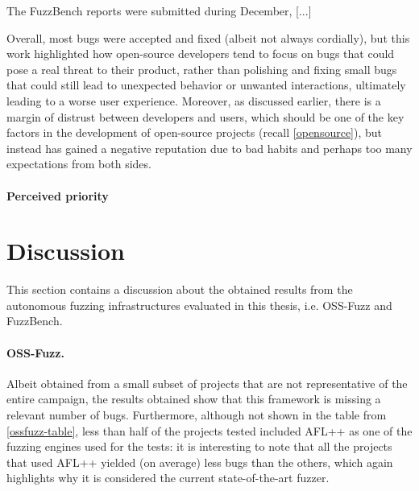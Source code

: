 The FuzzBench reports were submitted during December, [...] 

Overall, most bugs were accepted and fixed (albeit not always cordially), but this work highlighted how open-source developers tend to focus on bugs that could pose a real threat to their product, rather than polishing and fixing small bugs that could still lead to unexpected behavior or unwanted interactions, ultimately leading to a worse user experience. Moreover, as discussed earlier, there is a margin of distrust between developers and users, which should be one of the key factors in the development of open-source projects (recall \ref{opensource}), but instead has gained a negative reputation due to bad habits and perhaps too many expectations from both sides.


\paragraph{Perceived priority} 





\newpage
\section{Discussion}
This section contains a discussion about the obtained results from the autonomous fuzzing infrastructures evaluated in this thesis, i.e. OSS-Fuzz and FuzzBench.

\paragraph{OSS-Fuzz.} Albeit obtained from a small subset of projects that are not representative of the entire campaign, the results obtained show that this framework is missing a relevant number of bugs. Furthermore, although not shown in the table from \ref{ossfuzz-table}, less than half of the projects tested included AFL++ as one of the fuzzing engines used for the tests: it is interesting to note that all the projects that used AFL++ yielded (on average) less bugs than the others, which again highlights why it is considered the current state-of-the-art fuzzer.

